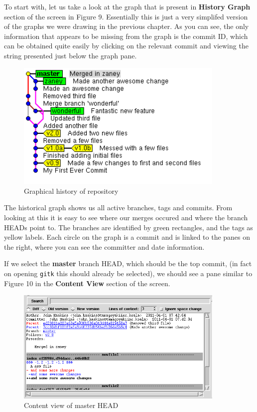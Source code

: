 To start with, let us take a look at the graph that is present in \textbf{History Graph} section of the screen in Figure 9.  Essentially this is just a very simplifed version of the graphs we were drawing in the previous chapter.  As you can see, the only information that appears to be missing from the graph is the commit ID, which can be obtained quite easily by clicking on the relevant commit and viewing the string presented just below the graph pane.

\begin{figure}[hbt]
\centering
\includegraphics[width=10cm]{images/f-w5-d9.png}
\caption{Graphical history of repository}
\end{figure} 

The historical graph shows us all active branches, tags and commits.  From looking at this it is easy to see where our merges occured and where the branch HEADs point to.  The branches are identified by green rectangles, and the tags as yellow labels.  Each circle on the graph is a commit and is linked to the panes on the right, where you can see the committer and date information.

If we select the \textbf{master} branch HEAD, which should be the top commit, (in fact on opening \texttt{gitk} this should already be selected), we should see a pane similar to Figure 10 in the \textbf{Content View} section of the screen.

\begin{figure}[hbt]
\centering
\includegraphics[width=10cm]{images/f-w5-d10.png}
\caption{Content view of master HEAD}
\end{figure} 

